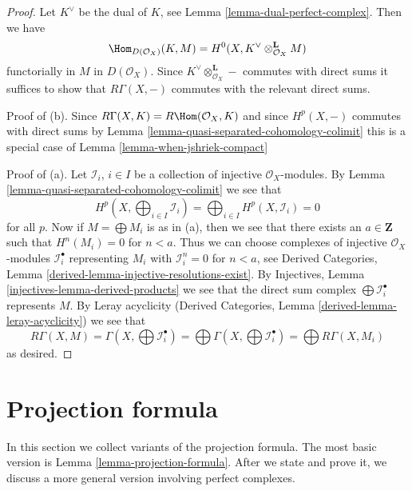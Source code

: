 \begin{proof}
Let $K^\vee$ be the dual of $K$, see
Lemma \ref{lemma-dual-perfect-complex}. Then we have
$$
\Hom_{D(\mathcal{O}_X)}(K, M) =
H^0(X, K^\vee \otimes_{\mathcal{O}_X}^\mathbf{L} M)
$$
functorially in $M$ in $D(\mathcal{O}_X)$.
Since $K^\vee \otimes_{\mathcal{O}_X}^\mathbf{L} -$ commutes with
direct sums it suffices
to show that $R\Gamma(X, -)$ commutes with the relevant direct sums.

\medskip\noindent
Proof of (b). Since $R\Gamma(X, K) = R\Hom(\mathcal{O}_X, K)$
and since $H^p(X, -)$ commutes with direct sums by
Lemma \ref{lemma-quasi-separated-cohomology-colimit}
this is a special case of
Lemma \ref{lemma-when-jshriek-compact}

\medskip\noindent
Proof of (a). Let $\mathcal{I}_i$, $i \in I$ be a collection of injective
$\mathcal{O}_X$-modules. By Lemma \ref{lemma-quasi-separated-cohomology-colimit}
we see that
$$
H^p(X, \bigoplus\nolimits_{i \in I} \mathcal{I}_i) =
\bigoplus\nolimits_{i \in I} H^p(X, \mathcal{I}_i) = 0
$$
for all $p$. Now if $M = \bigoplus M_i$ is as in (a), then we
see that there exists an $a \in \mathbf{Z}$ such that $H^n(M_i) = 0$
for $n < a$. Thus we can choose complexes of injective $\mathcal{O}_X$-modules
$\mathcal{I}_i^\bullet$ representing $M_i$
with $\mathcal{I}_i^n = 0$ for $n < a$, see
Derived Categories, Lemma \ref{derived-lemma-injective-resolutions-exist}.
By Injectives, Lemma \ref{injectives-lemma-derived-products}
we see that the direct sum complex $\bigoplus \mathcal{I}_i^\bullet$
represents $M$. By Leray acyclicity
(Derived Categories, Lemma \ref{derived-lemma-leray-acyclicity})
we see that
$$
R\Gamma(X, M) = \Gamma(X, \bigoplus \mathcal{I}_i^\bullet) =
\bigoplus \Gamma(X, \bigoplus \mathcal{I}_i^\bullet) =
\bigoplus R\Gamma(X, M_i)
$$
as desired.
\end{proof}


















\section{Projection formula}
\label{section-projection-formula}

\noindent
In this section we collect variants of the projection formula.
The most basic version is Lemma \ref{lemma-projection-formula}.
After we state and prove it, we discuss a more general version
involving perfect complexes.

